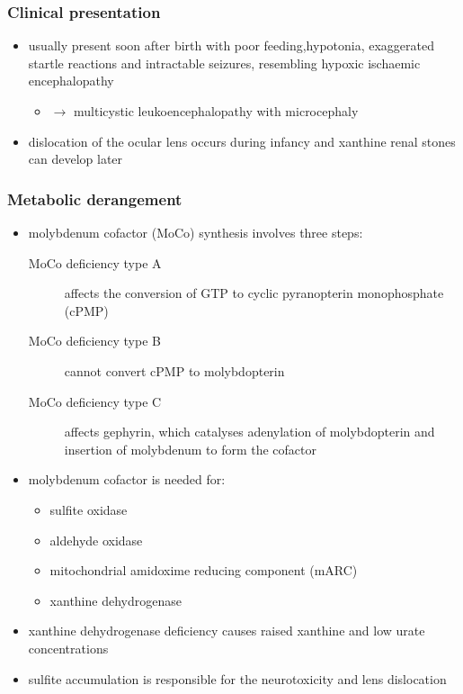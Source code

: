 \documentclass{scrartcl}
\begin{document}
\subsubsection{Clinical presentation}
\label{sec:org99307a6}
\begin{itemize}
\item usually present soon after birth with poor feeding,hypotonia,
exaggerated startle reactions and intractable seizures, resembling
hypoxic ischaemic encephalopathy
\begin{itemize}
\item \(\to\) multicystic leukoencephalopathy with microcephaly
\end{itemize}
\item dislocation of the ocular lens occurs during infancy and xanthine
renal stones can develop later
\end{itemize}

\subsubsection{Metabolic derangement}
\label{sec:orga7097d5}
\begin{itemize}
\item molybdenum cofactor (MoCo) synthesis involves three steps:
\begin{description}
\item[{MoCo deficiency type A}] affects the conversion of GTP to cyclic
pyranopterin monophosphate (cPMP)
\item[{MoCo deficiency type B}] cannot convert cPMP to molybdopterin
\item[{MoCo deficiency type C}] affects gephyrin, which catalyses
adenylation of molybdopterin and insertion of molybdenum to
form the cofactor
\end{description}
\item molybdenum cofactor is needed for:
\begin{itemize}
\item sulfite oxidase
\item aldehyde oxidase
\item mitochondrial amidoxime reducing component (mARC)
\item xanthine dehydrogenase
\end{itemize}
\item xanthine dehydrogenase deficiency causes raised xanthine and low
urate concentrations
\item sulfite accumulation is responsible for the neurotoxicity and lens
dislocation
\end{itemize}
\end{document}
